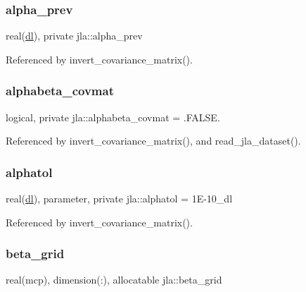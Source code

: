 \subsubsection{\texorpdfstring{alpha\+\_\+prev}{alpha\_prev}}
{\footnotesize\ttfamily real(\mbox{\hyperlink{namespacejla_a3aa6435b4e08f1d532390186ac608741}{dl}}), private jla\+::alpha\+\_\+prev\hspace{0.3cm}{\ttfamily [private]}}



Referenced by invert\+\_\+covariance\+\_\+matrix().

\mbox{\label{namespacejla_a337800de4314f7309ac0d0fb2f7a0278}} 
\subsubsection{\texorpdfstring{alphabeta\+\_\+covmat}{alphabeta\_covmat}}
{\footnotesize\ttfamily logical, private jla\+::alphabeta\+\_\+covmat = .F\+A\+L\+S\+E.\hspace{0.3cm}{\ttfamily [private]}}



Referenced by invert\+\_\+covariance\+\_\+matrix(), and read\+\_\+jla\+\_\+dataset().

\mbox{\label{namespacejla_a0298c9010520a99e272978ce5f61a83a}} 
\subsubsection{\texorpdfstring{alphatol}{alphatol}}
{\footnotesize\ttfamily real(\mbox{\hyperlink{namespacejla_a3aa6435b4e08f1d532390186ac608741}{dl}}), parameter, private jla\+::alphatol = 1\+E-\/10\+\_\+dl\hspace{0.3cm}{\ttfamily [private]}}



Referenced by invert\+\_\+covariance\+\_\+matrix().

\mbox{\label{namespacejla_a105d58f143e8da2dc75625cfaeed54e7}} 
\subsubsection{\texorpdfstring{beta\+\_\+grid}{beta\_grid}}
{\footnotesize\ttfamily real(mcp), dimension(\+:), allocatable jla\+::beta\+\_\+grid}



